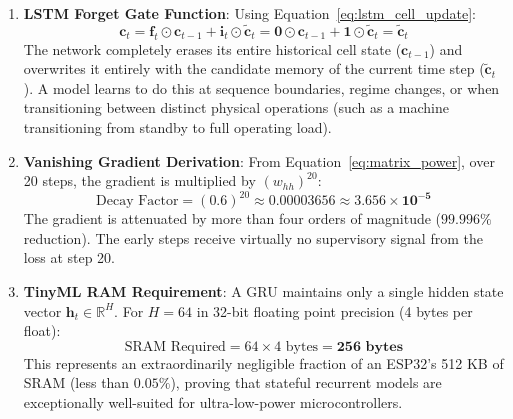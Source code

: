 \begin{enumerate}
\begin{itemize}
        \item \textbf{Step 2 ($t = 2$, $x_2 = -1.0$, $h_1 = 0.7616$)}:
        \begin{align*}
        z_2 &= w_{xh} x_2 + w_{hh} h_1 + b_h \\
            &= (1.0 \times (-1.0)) + (0.5 \times 0.7616) + 0.0 \\
            &= -1.0 + 0.3808 = -0.6192 \\
        h_2 &= \tanh(-0.6192) = \frac{e^{-0.6192} - e^{0.6192}}{e^{-0.6192} + e^{0.6192}} \approx \frac{0.5384 - 1.8574}{0.5384 + 1.8574} \\
            &= \frac{-1.3190}{2.3958} \approx \mathbf{-0.5505}
        \end{align*}
    \end{itemize}

    \item \textbf{LSTM Forget Gate Function}:
    Using Equation~\eqref{eq:lstm_cell_update}:
    \begin{equation*}
    \mathbf{c}_t = \mathbf{f}_t \odot \mathbf{c}_{t-1} + \mathbf{i}_t \odot \tilde{\mathbf{c}}_t = \mathbf{0} \odot \mathbf{c}_{t-1} + \mathbf{1} \odot \tilde{\mathbf{c}}_t = \tilde{\mathbf{c}}_t
    \end{equation*}
    The network completely erases its entire historical cell state ($\mathbf{c}_{t-1}$) and overwrites it entirely with the candidate memory of the current time step ($\tilde{\mathbf{c}}_t$). 
    A model learns to do this at sequence boundaries, regime changes, or when transitioning between distinct physical operations (such as a machine transitioning from standby to full operating load).

    \item \textbf{Vanishing Gradient Derivation}:
    From Equation~\eqref{eq:matrix_power}, over 20 steps, the gradient is multiplied by $(w_{hh})^{20}$:
    \begin{equation*}
    \text{Decay Factor} = (0.6)^{20} \approx \mathbf{0.00003656} \approx \mathbf{3.656 \times 10^{-5}}
    \end{equation*}
    The gradient is attenuated by more than four orders of magnitude ($99.996\%$ reduction). The early steps receive virtually no supervisory signal from the loss at step 20.

    \item \textbf{TinyML RAM Requirement}:
    A GRU maintains only a single hidden state vector $\mathbf{h}_t \in \mathbb{R}^{H}$.
    For $H = 64$ in 32-bit floating point precision (4 bytes per float):
    \begin{equation*}
    \text{SRAM Required} = 64 \times 4 \text{ bytes} = \mathbf{256 \text{ bytes}}
    \end{equation*}
    This represents an extraordinarily negligible fraction of an ESP32's 512 KB of SRAM (less than $0.05\%$), proving that stateful recurrent models are exceptionally well-suited for ultra-low-power microcontrollers.
\end{enumerate}
